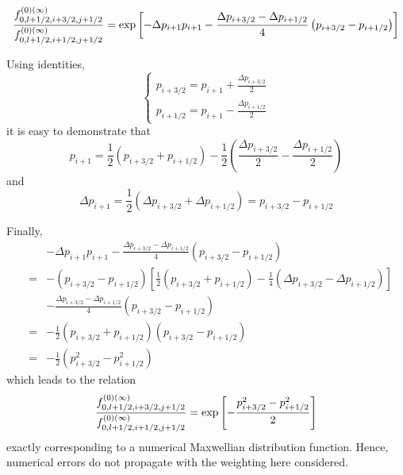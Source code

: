 \begin{equation}
\frac{f_{0,l+1/2,i+3/2,j+1/2}^{\left( 0\right) (\infty )}}{%
f_{0,l+1/2,i+1/2,j+1/2}^{\left( 0\right) (\infty )}}=\exp \left[ -\Delta
p_{i+1}p_{i+1}-\frac{\Delta p_{i+3/2}-\Delta p_{i+1/2}}{4}\left(
p_{i+3/2}-p_{i+1/2}\right) \right]
\end{equation}

Using identities,
\begin{equation}
\left\{
\begin{array}{l}
p_{i+3/2}=p_{i+1}+\frac{\Delta p_{i+3/2}}{2} \\
p_{i+1/2}=p_{i+1}-\frac{\Delta p_{i+1/2}}{2}
\end{array}
\right.
\end{equation}
it is easy to demonstrate that
\begin{equation}
p_{i+1}=\frac{1}{2}\left( p_{i+3/2}+p_{i+1/2}\right) -\frac{1}{2}\left(
\frac{\Delta p_{i+3/2}}{2}-\frac{\Delta p_{i+1/2}}{2}\right)
\end{equation}
and
\begin{equation}
\Delta p_{i+1}=\frac{1}{2}\left( \Delta p_{i+3/2}+\Delta p_{i+1/2}\right)
=p_{i+3/2}-p_{i+1/2}
\end{equation}

Finally,
\begin{eqnarray}
&&-\Delta p_{i+1}p_{i+1}-\frac{\Delta p_{i+3/2}-\Delta p_{i+1/2}}{4}\left(
p_{i+3/2}-p_{i+1/2}\right)  \nonumber \\
&=&-\left( p_{i+3/2}-p_{i+1/2}\right) \left[ \frac{1}{2}\left(
p_{i+3/2}+p_{i+1/2}\right) -\frac{1}{4}\left( \Delta p_{i+3/2}-\Delta
p_{i+1/2}\right) \right]  \nonumber \\
&&-\frac{\Delta p_{i+3/2}-\Delta p_{i+1/2}}{4}\left(
p_{i+3/2}-p_{i+1/2}\right)  \nonumber \\
&=&-\frac{1}{2}\left( p_{i+3/2}+p_{i+1/2}\right) \left(
p_{i+3/2}-p_{i+1/2}\right)  \nonumber \\
&=&-\frac{1}{2}\left( p_{i+3/2}^{2}-p_{i+1/2}^{2}\right)
\end{eqnarray}
which leads to the relation
\begin{equation}
\frac{f_{0,l+1/2,i+3/2,j+1/2}^{\left( 0\right) (\infty )}}{%
f_{0,l+1/2,i+1/2,j+1/2}^{\left( 0\right) (\infty )}}=\exp \left[ -\frac{
p_{i+3/2}^{2}-p_{i+1/2}^{2}}{2}\right]
\end{equation}
exactly corresponding to a numerical Maxwellian distribution function.
Hence, numerical errors do not propagate with the weighting here considered.

